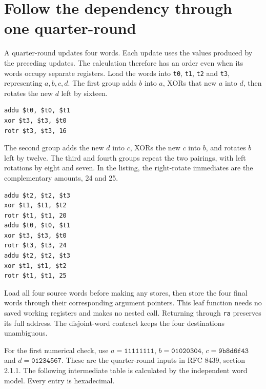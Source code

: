 \section{Follow the dependency through one quarter-round}
A quarter-round updates four words. Each update uses the values produced by the
preceding updates. The calculation therefore has an order even when its words occupy
separate registers. Load the words into \texttt{t0}, \texttt{t1}, \texttt{t2} and
\texttt{t3}, representing \(a,b,c,d\). The first group adds \(b\) into \(a\), XORs
that new \(a\) into \(d\), then rotates the new \(d\) left by sixteen.
\begin{verbatim}
addu $t0, $t0, $t1
xor $t3, $t3, $t0
rotr $t3, $t3, 16
\end{verbatim}

The second group adds the new \(d\) into \(c\), XORs the new \(c\) into \(b\), and
rotates \(b\) left by twelve. The third and fourth groups repeat the two pairings,
with left rotations by eight and seven. In the listing, the right-rotate immediates
are the complementary amounts, 24 and 25.
\begin{verbatim}
addu $t2, $t2, $t3
xor $t1, $t1, $t2
rotr $t1, $t1, 20
addu $t0, $t0, $t1
xor $t3, $t3, $t0
rotr $t3, $t3, 24
addu $t2, $t2, $t3
xor $t1, $t1, $t2
rotr $t1, $t1, 25
\end{verbatim}

Load all four source words before making any stores, then store the four final words
through their corresponding argument pointers. This leaf function needs no saved
working registers and makes no nested call. Returning through \texttt{ra} preserves
its full address. The disjoint-word contract keeps the four destinations unambiguous.

For the first numerical check, use \(a=\mathtt{11111111}\),
\(b=\mathtt{01020304}\), \(c=\mathtt{9b8d6f43}\) and
\(d=\mathtt{01234567}\). These are the quarter-round inputs in RFC 8439,
section 2.1.1. The following intermediate table is calculated by the independent
word model. Every entry is hexadecimal.

